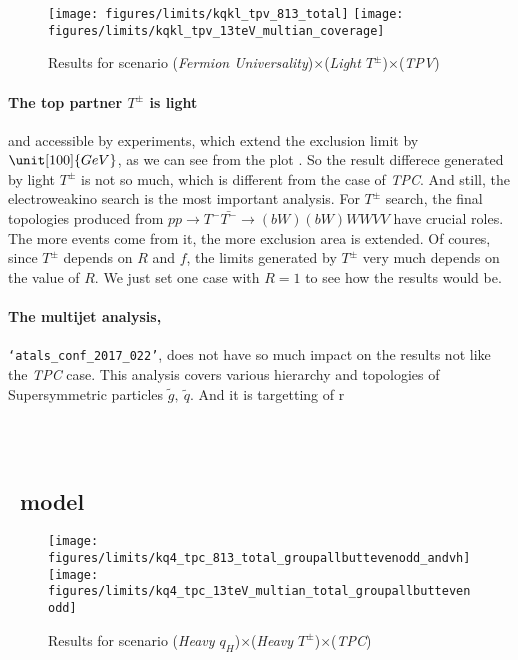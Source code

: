 \begin{figure*}[h]
\centering
\texttt{[image: figures/limits/kqkl\_tpv\_813\_total]} 
\texttt{[image: figures/limits/kqkl\_tpv\_13teV\_multian\_coverage]}
\caption{Results for scenario (\emph{Fermion Universality})$\times$(\emph{Light $T^\pm$})$\times$(\emph{TPV})}
\label{fig:cmresults:univtpvtop}
\end{figure*}
\paragraph{The top partner $T^\pm$ is light} and accessible by experiments, which extend the exclusion limit by $\unit[100]{GeV}$, as we can see from the plot . 
So the result differece generated by light $T^\pm$ is not so much, which is different from the case of \emph{TPC}. 
And still, the electroweakino search is the most important analysis. 
For $T^\pm$ search, the final topologies produced from $p p \to T^- \bar{T^-} \to (bW)(bW) WW VV$ have crucial roles. 
The more events come from it, the more exclusion area is extended.
Of coures, since $T^\pm$ depends on $R$ and $f$, the limits generated by $T^\pm$ very much depends on the value of $R$. 
We just set one case with $R=1$ to see how the results would be. 


\paragraph{The multijet analysis,} \texttt{`atals\_conf\_2017\_022'}, does not have so much impact on the results not like the \emph{TPC} case.
This analysis covers various hierarchy and topologies of Supersymmetric particles $\tilde{g},~\tilde{q}$.
And it is targetting of r

\\
\\



\subsection{\hq~model}

\begin{figure*}
\centering
\texttt{[image: figures/limits/kq4\_tpc\_813\_total\_groupallbuttevenodd\_andvh]} 
\texttt{[image: figures/limits/kq4\_tpc\_13teV\_multian\_total\_groupallbuttevenodd]}
\caption{Results for scenario (\emph{Heavy $q_H$})$\times$(\emph{Heavy $T^\pm$})$\times$(\emph{TPC})}
\label{fig:cmresults:heavytpcnotop}
\end{figure*}

